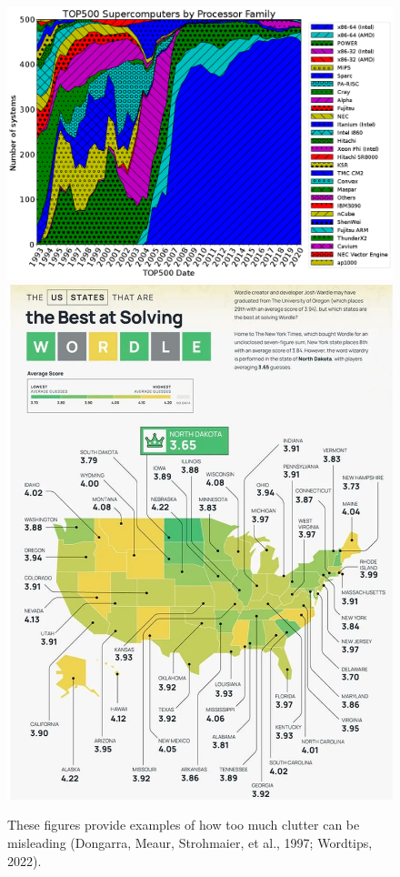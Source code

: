 \documentclass[print]{nuthesis}
\begin{document}
\begin{figure}[tbp]

{\centering \includegraphics[width=0.49\linewidth,]{images/misleading-graphics-bad-form-supercomputers} \includegraphics[width=0.49\linewidth,]{images/misleading-graphics-wordle-map} 

}

\caption[Misleading 'chartjunk' examples]{These figures provide examples of how too much clutter can be misleading (Dongarra, Meaur, Strohmaier, et al., 1997; Wordtips, 2022).}\label{fig:misleading-graphics-chartjunk}
\end{figure}
\end{document}
